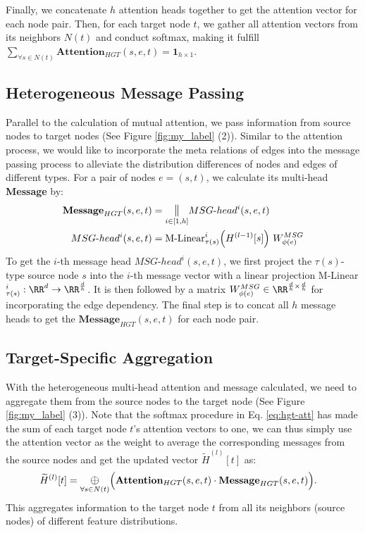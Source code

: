 \documentclass[sigconf]{acmart}
\theoremstyle{definition}
\begin{document}
Finally, we concatenate $h$ attention heads together to get the attention vector for each node pair. 
Then, for each target node $t$, we gather all attention vectors from its neighbors $N(t)$ and conduct softmax, making it fulfill $\sum_{\forall s \in N(t)}\textbf{Attention}_{HGT}(s,e,t) = \mathbf{1}_{h \times 1}$.



\subsection{Heterogeneous Message Passing}
Parallel to the calculation of mutual attention, we pass information from source nodes to target nodes (See Figure \ref{fig:my_label} (2)). 
Similar to the attention process, we would like to incorporate the meta relations of edges into the message passing process to alleviate the distribution differences of nodes and edges of different types. For a pair of nodes $e =(s,t)$, we calculate its multi-head \textbf{Message} by:
\begin{align}
\textbf{Message}_{HGT}(s,e,t)&  = \underset{i \in [1,h]}{\mathlarger{\mathbin\Vert}}MSG\text{-}head^{i}(s,e, t)\\
MSG\text{-}head^{i}(s,e, t)&  = \text{M-Linear}^i_{\tau(s)}\Big({H}^{(l-1)}[s]\Big) \ W^{MSG}_{\phi(e)} \nonumber
\end{align}
To get the $i$-th message head $MSG\text{-}head^{i}(s,e,t)$, we first project the $\tau(s)$-type source node $s$ into the $i$-th message vector with a linear projection M-Linear$^i_{\tau(s)}: \RR^{d} \rightarrow \RR^{\frac{d}{h}}$. 
It is then followed by a matrix $W^{MSG}_{\phi(e)}\in\RR^{\frac{d}{h}\times\frac{d}{h}}$ for incorporating the edge dependency. 
The final step is to concat all $h$ message heads to get the  $\textbf{Message}_{HGT}(s,e, t)$ for each node pair.


\subsection{Target-Specific Aggregation}
With the heterogeneous multi-head attention and message calculated, we need to aggregate them from the source nodes to the target node (See Figure \ref{fig:my_label} (3)). 
Note that the softmax procedure in Eq. \ref{eq:hgt-att} has made the sum of each target node $t$'s attention vectors to one, we can thus simply use the attention vector as the weight to average the corresponding messages from the source nodes and get the updated vector $\widetilde{H}^{(l)}[t]$ as:
\begin{align}
\widetilde{H}^{(l)}[t] &= \underset{\forall s \in N(t)}{\mathlarger{\oplus}}\Big(\textbf{Attention}_{HGT}(s, e, t) \cdot \textbf{Message}_{HGT}(s, e, t)\Big). \nonumber
\end{align}
This aggregates information to the target node $t$ from all its neighbors (source nodes) of different feature distributions. 
\end{document}
